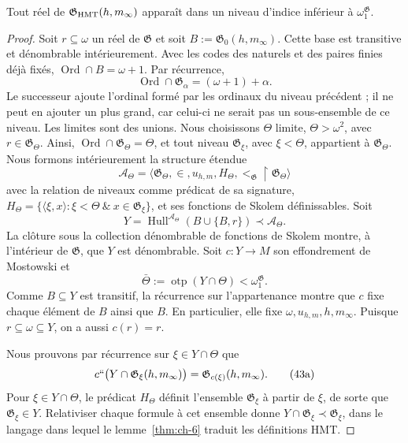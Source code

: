 \begin{lemma}
\label{thm:ch-8}
Tout réel de
\(\mathfrak G_{\rm HMT}(h,m_\infty)\) apparaît dans un niveau d’indice inférieur à
\(\omega_1^{\mathfrak G}\).

\end{lemma}
\begin{proof}
Soit \(r\subseteq\omega\) un réel de \(\mathfrak G\) et soit
\(B:=\mathfrak G_0(h,m_\infty)\). Cette base est transitive et dénombrable
intérieurement. Avec les codes des naturels et des paires finies déjà fixés,
\(\operatorname{Ord}\cap B=\omega+1\). Par récurrence,
\[
 \operatorname{Ord}\cap\mathfrak G_\alpha=(\omega+1)+\alpha.
\]
Le successeur ajoute l’ordinal formé par les ordinaux du niveau précédent ;
il ne peut en ajouter un plus grand, car celui-ci ne serait pas un sous-ensemble de ce niveau. Les
limites sont des unions. Nous choisissons \(\Theta\) limite, \(\Theta>\omega^2\),
avec \(r\in\mathfrak G_\Theta\). Ainsi,
\(\operatorname{Ord}\cap\mathfrak G_\Theta=\Theta\), et tout niveau
\(\mathfrak G_\xi\), avec \(\xi<\Theta\), appartient à
\(\mathfrak G_\Theta\). Nous formons intérieurement la structure étendue
\[
 \mathcal A_\Theta=
 \langle\mathfrak G_\Theta,\in,u_{h,m},
         H_\Theta,<_{\mathfrak G}\!\upharpoonright\mathfrak G_\Theta\rangle
\]
avec la relation de niveaux comme prédicat de sa signature,
\(H_\Theta=\{\langle\xi,x\rangle:\xi<\Theta\ \&\
x\in\mathfrak G_\xi\}\), et ses fonctions de Skolem définissables. Soit
\[
 Y=\operatorname{Hull}^{\mathcal A_\Theta}
   (B\cup\{B,r\})\prec\mathcal A_\Theta .
\]
La clôture sous la collection dénombrable de fonctions de Skolem montre, à l'intérieur de \(\mathfrak G\), que \(Y\) est dénombrable. Soit \(c:Y\rightarrow M\) son effondrement de Mostowski et
\[
 \bar\Theta:=\operatorname{otp}(Y\cap\Theta)
 <\omega_1^{\mathfrak G}.
\]
Comme \(B\subseteq Y\) est transitif, la récurrence sur l’appartenance montre
que \(c\) fixe chaque élément de \(B\) ainsi que \(B\). En particulier,
elle fixe \(\omega,u_{h,m},h,m_\infty\). Puisque
\(r\subseteq\omega\subseteq Y\), on a aussi \(c(r)=r\).

Nous prouvons par récurrence sur \(\xi\in Y\cap\Theta\) que
\[
 c``\bigl(Y\cap\mathfrak G_\xi(h,m_\infty)\bigr)
 =\mathfrak G_{c(\xi)}(h,m_\infty).
\tag{43a}\label{eq:ch-condensacion}
\]
Pour \(\xi\in Y\cap\Theta\), le prédicat \(H_\Theta\) définit
l’ensemble \(\mathfrak G_\xi\) à partir de \(\xi\), de sorte que
\(\mathfrak G_\xi\in Y\). Relativiser chaque formule à cet ensemble donne
\(Y\cap\mathfrak G_\xi\prec\mathfrak G_\xi\), dans le langage dans lequel
le lemme~\ref{thm:ch-6} traduit les définitions HMT.


\end{proof}
